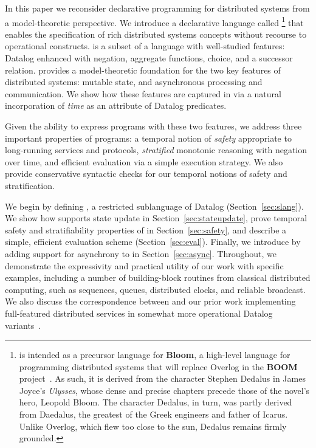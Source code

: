 In this paper we reconsider declarative programming for distributed
systems from a model-theoretic perspective. We introduce a declarative
language called \lang\footnote{\small \lang is intended as a precursor
  language for \textbf{Bloom}, a high-level language for programming
  distributed systems that will replace Overlog in the \textbf{BOOM}
  project~\cite{boom-techr}.  As such, it is derived from the
  character Stephen Dedalus in James Joyce's \emph{Ulysses}, whose
  dense and precise chapters precede those of the novel's hero,
  Leopold Bloom.  The character Dedalus, in turn, was partly derived
  from Daedalus, the greatest of the Greek engineers and father of
  Icarus.  Unlike Overlog, which flew too close to the sun, Dedalus
  remains firmly grounded.  } that enables the specification of rich
distributed systems concepts without recourse to operational
constructs.  \lang is a subset of a language with well-studied
features: Datalog enhanced with negation, aggregate functions, choice,
and a successor relation.  \lang provides a model-theoretic foundation
for the two key features of distributed systems: mutable state, and
asynchronous processing and communication.  We show how these features
are captured in \lang via a natural incorporation of {\em time} as an
attribute of Datalog predicates.

Given the ability to express programs with these two features, we
address three important properties of \lang programs: a temporal
notion of {\em safety} appropriate to long-running services and
protocols, {\em stratified} monotonic reasoning with negation over
time, and efficient evaluation via a simple execution strategy.  We
also provide conservative syntactic checks for our temporal notions of
safety and stratification.

We begin by defining \slang, a restricted sublanguage of Datalog
(Section~\ref{sec:slang}). We show how \slang supports state update in
Section~\ref{sec:stateupdate}, prove temporal safety and
stratifiability properties of \slang in Section~\ref{sec:safety}, and
describe a simple, efficient evaluation scheme
(Section~\ref{sec:eval}). Finally, we introduce \lang by adding
support for asynchrony to \slang in
Section~\ref{sec:async}. Throughout, we demonstrate the expressivity
and practical utility of our work with specific examples, including a
number of building-block routines from classical distributed
computing, such as sequences, queues, distributed clocks, and reliable
broadcast.  We also discuss the correspondence between \lang and our
prior work implementing full-featured distributed services in somewhat
more operational Datalog variants~\cite{boom-techr,Loo2009-CACM}.

